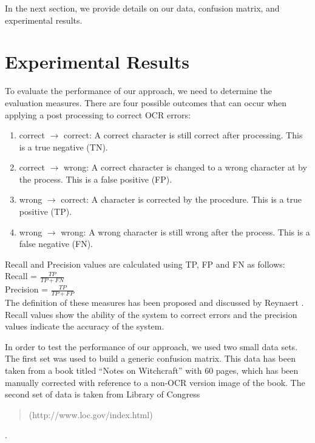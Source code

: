 \documentclass{article}
\begin{document}
In the next section, we provide details on our data, confusion matrix,
and experimental results.



\section{Experimental Results}
\label{sec:experiment}

To evaluate the performance of our approach, we need to determine the
evaluation measures. There are four possible outcomes that can occur
when applying a post processing to correct OCR errors:

\begin{enumerate}
\item correct $\rightarrow$ correct: A correct character is still
  correct after processing. This is a true negative (TN). \\

\item correct $\rightarrow$ wrong: A correct character is changed to a
  wrong character at by the process. This is a false positive (FP). \\

\item wrong $\rightarrow$ correct: A character is corrected by the
  procedure. This is a true positive (TP). \\

\item wrong $\rightarrow$ wrong: A wrong character is still wrong
  after the process. This is a false negative (FN). \\

\end{enumerate}

Recall and Precision values are calculated using TP, FP and FN as
follows: \\ Recall = $\frac{TP }{TP+FN }$\\ Precision = $\frac{TP
}{TP+FP}$\\ The definition of these measures has been proposed and
discussed by Reynaert \cite{Reynaert}. Recall values show the ability
of the system to correct errors and the precision values indicate the
accuracy of the system.

In order to test the performance of our approach, we used two small
data sets. The first set was used to build a generic confusion
matrix. This data has been taken from a book titled “Notes on
Witchcraft” with 60 pages, which has been manually corrected with
reference to a non-OCR version image of the book. The second set of
data is taken from Library of
Congress \begin{quote}(http://www.loc.gov/index.html)\end{quote}.
\end{document}
